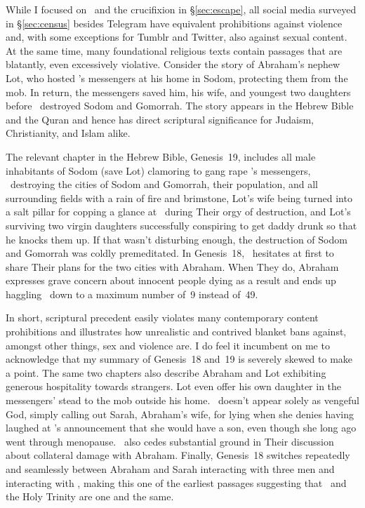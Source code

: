 While I focused on \DALLE\ and the crucifixion in \S\ref{sec:escape}, all social
media surveyed in \S\ref{sec:census} besides Telegram have equivalent
prohibitions against violence and, with some exceptions for Tumblr and Twitter,
also against sexual content. At the same time, many foundational religious texts
contain passages that are blatantly, even excessively violative. Consider the
story of Abraham's nephew Lot, who hosted \YHWH's messengers at his home in
Sodom, protecting them from the mob. In return, the messengers saved him, his
wife, and youngest two daughters before \YHWH\ destroyed Sodom and Gomorrah. The
story appears in the Hebrew Bible and the Quran and hence has direct scriptural
significance for Judaism, Christianity, and Islam alike.

The relevant chapter in the Hebrew Bible, Genesis~19, includes all male
inhabitants of Sodom (save Lot) clamoring to gang rape \YHWH's messengers,
\YHWH\ destroying the cities of Sodom and Gomorrah, their population, and all
surrounding fields with a rain of fire and brimstone, Lot's wife being turned
into a salt pillar for copping a glance at \YHWH\ during Their orgy of
destruction, and Lot's surviving two virgin daughters successfully conspiring to
get daddy drunk so that he knocks them up. If that wasn't disturbing enough, the
destruction of Sodom and Gomorrah was coldly premeditated. In Genesis~18, \YHWH\
hesitates at first to share Their plans for the two cities with Abraham. When
They do, Abraham expresses grave concern about innocent people dying as a result
and ends up haggling \YHWH\ down to a maximum number of~9 instead of~49.

In short, scriptural precedent easily violates many contemporary content
prohibitions and illustrates how unrealistic and contrived blanket bans against,
amongst other things, sex and violence are. I do feel it incumbent on me to
acknowledge that my summary of Genesis~18 and~19 is severely skewed to make a
point. The same two chapters also describe Abraham and Lot exhibiting generous
hospitality towards strangers. Lot even offer his own daughter in the
messengers' stead to the mob outside his home. \YHWH\ doesn't appear solely as
vengeful God, simply calling out Sarah, Abraham's wife, for lying when she
denies having laughed at \YHWH's announcement that she would have a son, even
though she long ago went through menopause. \YHWH\ also cedes substantial ground
in Their discussion about collateral damage with Abraham. Finally, Genesis~18
switches repeatedly and seamlessly between Abraham and Sarah interacting with
three men and interacting with \YHWH, making this one of the earliest passages
suggesting that \YHWH\ and the Holy Trinity are one and the same.


